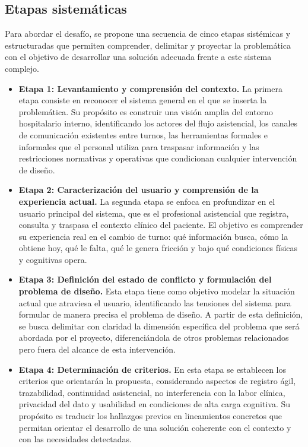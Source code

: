 
\subsection{Etapas sistemáticas}
Para abordar el desafío, se propone una secuencia de cinco etapas sistémicas y estructuradas que permiten comprender, delimitar y proyectar la problemática con el objetivo de desarrollar una solución adecuada frente a este sistema complejo.\\

\begin{itemize}
    \item \textbf{Etapa 1: Levantamiento y comprensión del contexto.}
    La primera etapa consiste en reconocer el sistema general en el que se inserta la problemática. Su propósito es construir una visión amplia del entorno hospitalario interno, identificando los actores del flujo asistencial, los canales de comunicación existentes entre turnos, las herramientas formales e informales que el personal utiliza para traspasar información y las restricciones normativas y operativas que condicionan cualquier intervención de diseño.

    \item \textbf{Etapa 2: Caracterización del usuario y comprensión de la experiencia actual.}
    La segunda etapa se enfoca en profundizar en el usuario principal del sistema, que es el profesional asistencial que registra, consulta y traspasa el contexto clínico del paciente. El objetivo es comprender su experiencia real en el cambio de turno: qué información busca, cómo la obtiene hoy, qué le falta, qué le genera fricción y bajo qué condiciones físicas y cognitivas opera.

    \item \textbf{Etapa 3: Definición del estado de conflicto y formulación del problema de diseño.}
    Esta etapa tiene como objetivo modelar la situación actual que atraviesa el usuario, identificando las tensiones del sistema para formular de manera precisa el problema de diseño. A partir de esta definición, se busca delimitar con claridad la dimensión específica del problema que será abordada por el proyecto, diferenciándola de otros problemas relacionados pero fuera del alcance de esta intervención.

    \item \textbf{Etapa 4: Determinación de criterios.}
    En esta etapa se establecen los criterios que orientarán la propuesta, considerando aspectos de registro ágil, trazabilidad, continuidad asistencial, no interferencia con la labor clínica, privacidad del dato y usabilidad en condiciones de alta carga cognitiva. Su propósito es traducir los hallazgos previos en lineamientos concretos que permitan orientar el desarrollo de una solución coherente con el contexto y con las necesidades detectadas.


\end{itemize}
